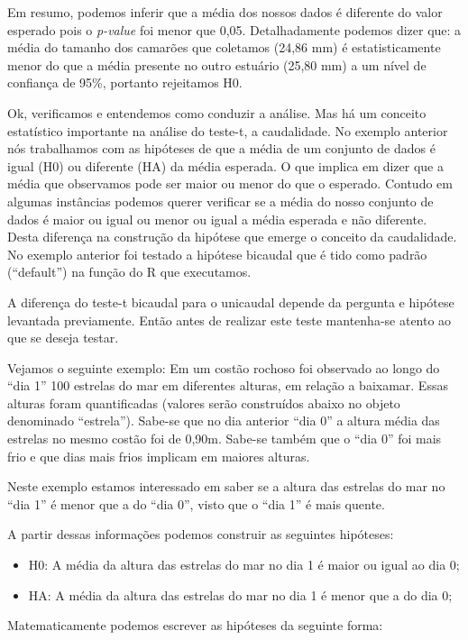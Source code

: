 \documentclass[titlepage, oneside, openany, a4paper]{book}
\begin{document}
Em resumo, podemos inferir que a média dos nossos dados é diferente do valor esperado pois o \emph{p-value} foi menor que 0,05. Detalhadamente podemos dizer que: a média do tamanho dos camarões que coletamos (24,86 mm) é estatisticamente menor do que a média presente no outro estuário (25,80 mm) a um nível de confiança de 95\%, portanto rejeitamos H0.

Ok, verificamos e entendemos como conduzir a análise. Mas há um conceito estatístico importante na análise do teste-t, a caudalidade. No exemplo anterior nós trabalhamos com as hipóteses de que a média de um conjunto de dados é igual (H0) ou diferente (HA) da média esperada. O que implica em dizer que a média que observamos pode ser maior ou menor do que o esperado. Contudo em algumas instâncias podemos querer verificar se a média do nosso conjunto de dados é maior ou igual ou menor ou igual a média esperada e não diferente. Desta diferença na construção da hipótese que emerge o conceito da caudalidade. No exemplo anterior foi testado a hipótese bicaudal que é tido como padrão (``default'') na função do R que executamos.

A diferença do teste-t bicaudal para o unicaudal depende da pergunta e hipótese levantada previamente. Então antes de realizar este teste mantenha-se atento ao que se deseja testar.

Vejamos o seguinte exemplo: Em um costão rochoso foi observado ao longo do ``dia 1'' 100 estrelas do mar em diferentes alturas, em relação a baixamar. Essas alturas foram quantificadas (valores serão construídos abaixo no objeto denominado ``estrela''). Sabe-se que no dia anterior ``dia 0'' a altura média das estrelas no mesmo costão foi de 0,90m. Sabe-se também que o ``dia 0'' foi mais frio e que dias mais frios implicam em maiores alturas.

Neste exemplo estamos interessado em saber se a altura das estrelas do mar no ``dia 1'' é menor que a do ``dia 0'', visto que o ``dia 1'' é mais quente.

A partir dessas informações podemos construir as seguintes hipóteses:

\begin{itemize}
\item
  H0: A média da altura das estrelas do mar no dia 1 é maior ou igual ao dia 0;
\item
  HA: A média da altura das estrelas do mar no dia 1 é menor que a do dia 0;
\end{itemize}

Matematicamente podemos escrever as hipóteses da seguinte forma:
\end{document}
